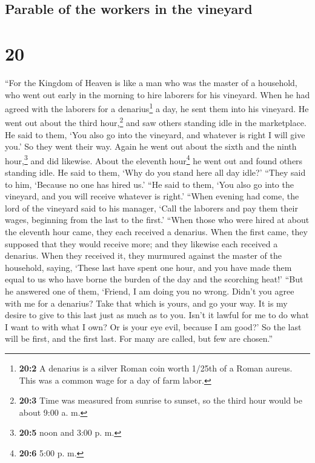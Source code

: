 \hypertarget{parable-of-the-workers-in-the-vineyard}{%
\subsection{Parable of the workers in the
vineyard}\label{parable-of-the-workers-in-the-vineyard}}

\hypertarget{section-19}{%
\section{20}\label{section-19}}

 ``For the Kingdom of Heaven is like a man who was the
master of a household, who went out early in the morning to hire
laborers for his vineyard.  When he had agreed with the
laborers for a denarius\footnote{\textbf{20:2} A denarius is a silver
  Roman coin worth 1/25th of a Roman aureus. This was a common wage for
  a day of farm labor.} a day, he sent them into his vineyard.
 He went out about the third hour,\footnote{\textbf{20:3}
  Time was measured from sunrise to sunset, so the third hour would be
  about 9:00 a. m.} and saw others standing idle in the marketplace.
 He said to them, `You also go into the vineyard, and
whatever is right I will give you.' So they went their way.
 Again he went out about the sixth and the ninth
hour,\footnote{\textbf{20:5} noon and 3:00 p. m.} and did likewise.
 About the eleventh hour\footnote{\textbf{20:6} 5:00 p. m.}
he went out and found others standing idle. He said to them, `Why do you
stand here all day idle?'  ``They said to him, `Because no
one has hired us.' ``He said to them, `You also go into the vineyard,
and you will receive whatever is right.'  ``When evening
had come, the lord of the vineyard said to his manager, `Call the
laborers and pay them their wages, beginning from the last to the
first.'  ``When those who were hired at about the eleventh
hour came, they each received a denarius.  When the first
came, they supposed that they would receive more; and they likewise each
received a denarius.  When they received it, they
murmured against the master of the household,  saying,
`These last have spent one hour, and you have made them equal to us who
have borne the burden of the day and the scorching heat!'
 ``But he answered one of them, `Friend, I am doing you
no wrong. Didn't you agree with me for a denarius?  Take
that which is yours, and go your way. It is my desire to give to this
last just as much as to you.  Isn't it lawful for me to
do what I want to with what I own? Or is your eye evil, because I am
good?'  So the last will be first, and the first last.
For many are called, but few are chosen.''

